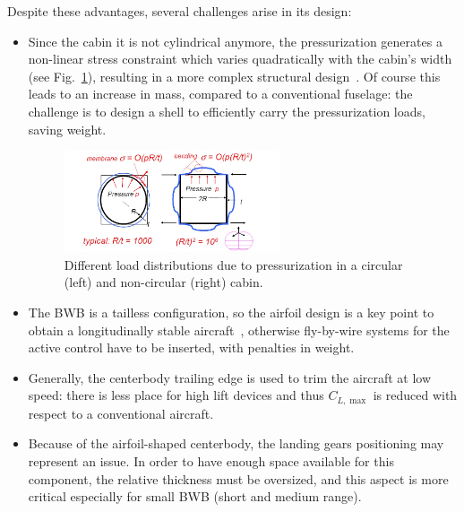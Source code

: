 Despite these advantages, several challenges arise in its design:
\begin{itemize}
	\item Since the cabin it is not cylindrical anymore, the pressurization generates a non-linear stress constraint which varies quadratically with the cabin's width (see Fig.~\ref{fig:pressure_constraint}), resulting in a more complex structural design~\cite{bib:liebeck_1998, bib:mukhopadhayay_2004, bib:mukhopadhayay_2005}. 
	Of course this leads to an increase in mass, compared to a conventional fuselage: the challenge is to design a shell to efficiently carry the pressurization loads, saving weight.
	\begin{figure}[h!]
		\centering
		\includegraphics[keepaspectratio, width=0.6\textwidth]{images/chap1/pressurization_constraint.jpg}
		\caption{Different load distributions due to pressurization in a circular (left) and non-circular (right) cabin.}
		\label{fig:pressure_constraint}
	\end{figure}

	\item The BWB is a tailless configuration, so the airfoil design is a key point to obtain a longitudinally stable aircraft~\cite{bib:nickel}, otherwise fly-by-wire systems for the active control have to be inserted, with penalties in weight.
	
	\item Generally, the centerbody trailing edge is used to trim the aircraft at low speed: there is less place for high lift devices and thus $C_{L,\max}$ is reduced with respect to a conventional aircraft.
	
	\item Because of the airfoil-shaped centerbody, the landing gears positioning may represent an issue. 
	In order to have enough space available for this component, the relative thickness must be oversized, and this aspect is more critical especially for small BWB (short and medium range). 
\end{itemize}

